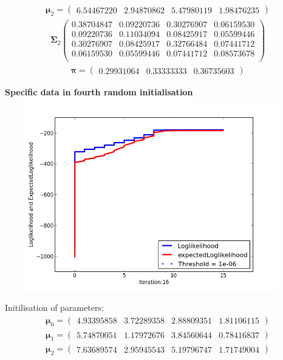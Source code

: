 \documentclass[11pt,a4paper]{article}
\newcommand{\htab}{\hspace*{0.63cm}}
\newcommand{\bs}[1]{\boldsymbol{#1}}
\begin{document}
        \begin{align} \bs{\mu}_{2} = \begin{pmatrix} 
            6.54467220 & 2.94870862 & 5.47980119 & 1.98476235 
        \end{pmatrix}  \end{align}\vspace{-1cm} 
        \begin{align} \bs{\Sigma}_{2}\begin{pmatrix} 
            0.38704847 & 0.09220736 & 0.30276907 & 0.06159530 \\ 
            0.09220736 & 0.11034094 & 0.08425917 & 0.05599446 \\ 
            0.30276907 & 0.08425917 & 0.32766484 & 0.07441712 \\ 
            0.06159530 & 0.05599446 & 0.07441712 & 0.08573678 \\ 
        \end{pmatrix} \end{align}
        \begin{align}  \bs{\pi} = \begin{pmatrix}
            0.29931064 & 0.33333333 & 0.36735603
        \end{pmatrix} \end{align}
\newpage
\begin{center}
    \textbf{Specific data in fourth random initialisation}
    \includegraphics[width=5in,height=3.3in]{./Result/figure_4.png}
\end{center}
\htab Initilisation of parameters:
\begin{align} 
    \bs{\mu}_{0} = \begin{pmatrix} 
4.93395858 & 3.72289358 & 2.88809351 & 1.81106115
 \end{pmatrix}   \\
    \bs{\mu}_{1} = \begin{pmatrix} 
5.74870051 & 1.17972676 & 3.84560644 & 0.78416837 
 \end{pmatrix}    \\
    \bs{\mu}_{2} = \begin{pmatrix} 
7.63689574 & 2.95945543 & 5.19796747 & 1.71749004
    \end{pmatrix}  \end{align} \vspace{-1cm}
\end{document}
